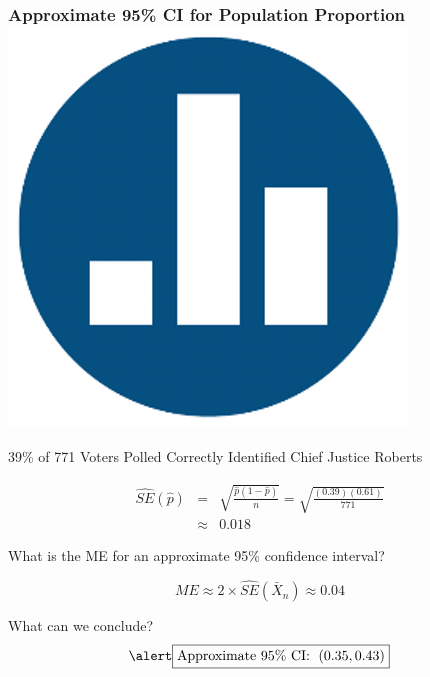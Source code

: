 \documentclass[handout]{beamer}
\begin{document}
\begin{frame}
\frametitle{Approximate 95\% CI for Population Proportion\hfill \includegraphics[scale = 0.05]{./images/clicker}}
39\% of 771 Voters Polled Correctly Identified Chief Justice Roberts

\begin{eqnarray*}
	\widehat{SE}(\widehat{p}) &=& \sqrt{\frac{\widehat{p}(1-\widehat{p})}{n}} = \sqrt{\frac{(0.39)(0.61)}{771}}\\ 
	&\approx& 0.018 
\end{eqnarray*}

\alert{What is the ME for an approximate 95\% confidence interval?} \pause

$$ME \approx 2 \times \widehat{SE}(\bar{X}_n) \approx 0.04$$ \pause

What can we conclude?
$$\alert{\boxed{\mbox{Approximate 95\% CI: } \; (0.35, 0.43)}}$$

\end{frame}

\end{document}
